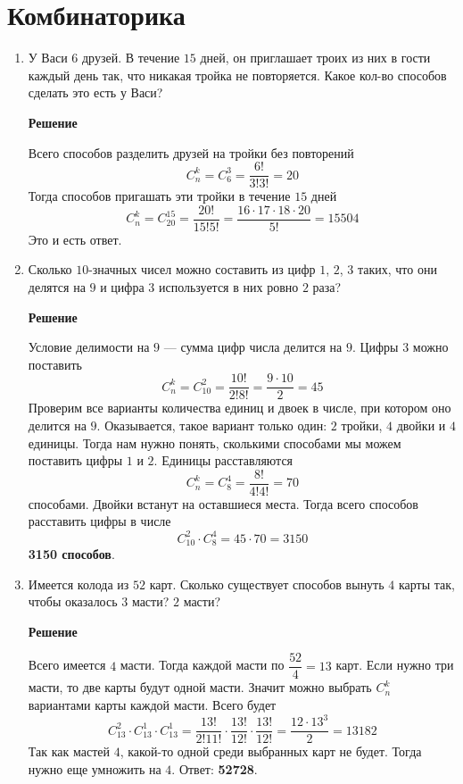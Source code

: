 \documentclass[12pt]{article}
\newcommand{\RomanNumeralCaps}[1]
{\MakeUppercase{\romannumeral #1}}
\begin{document}
	\section{Комбинаторика \RomanNumeralCaps{1}}
	\begin{enumerate}[label={\textbf{\arabic{section}.\arabic*}}]
		\item У Васи $6$ друзей. В течение $15$ дней, он приглашает троих из них в гости	каждый день так, что никакая тройка не повторяется. Какое кол-во способов	сделать это есть у Васи?

		
		\textbf{Решение}
		
		Всего способов разделить друзей на тройки без повторений 
		$$
		C_n^k = C_6^3 = \frac{6!}{3!3!} = 20
		$$
		Тогда способов пригашать эти тройки в течение $15$ дней
		$$
		C_n^k = C_{20}^{15} = \frac{20!}{15!5!} = \frac{16\cdot17\cdot18\cdot20}{5!} = 15504
		$$
		Это и есть ответ.
		
		\item Сколько $10$-значных чисел можно составить из цифр $1$, $2$, $3$ таких, что они делятся на $9$ и цифра $3$ используется в них ровно $2$ раза?
		
		\textbf{Решение}
		
		Условие делимости на $9$ --- сумма цифр числа делится на $9$. Цифры $3$ можно поставить 
		$$
		C_n^k = C_{10}^{2} = \frac{10!}{2!8!} = \frac{9\cdot10}{2} = 45
		$$
		Проверим все варианты количества единиц и двоек в числе, при котором оно делится на $9$. Оказывается, такое вариант только один: $2$ тройки, $4$ двойки и $4$ единицы. Тогда нам нужно понять, сколькими способами мы можем поставить цифры $1$ и $2$. Единицы расставляются
		$$
		C_n^k = C_{8}^{4} = \frac{8!}{4!4!} = 70
		$$
		способами. Двойки встанут на оставшиеся места. Тогда всего способов расставить цифры в числе
		$$
		C_{10}^{2}\cdot C_{8}^{4} = 45\cdot70 = 3150
		$$
		\textbf{3150 способов}.
		
		\item Имеется колода из $52$ карт. Сколько существует способов вынуть $4$ карты так, чтобы оказалось $3$ масти? $2$ масти?
		
		\textbf{Решение}
		
		Всего имеется $4$ масти. Тогда каждой масти по $\dfrac{52}{4} = 13$ карт. Если нужно три масти, то две карты будут одной масти. Значит можно выбрать $C_n^k$ вариантами карты каждой масти. Всего будет
		$$
		C_{13}^{2}\cdot C_{13}^{1}\cdot C_{13}^{1} = \frac{13!}{2!11!}\cdot \frac{13!}{12!}\cdot \frac{13!}{12!} = \frac{12\cdot13^3}{2} = 13182
		$$
		Так как мастей $4$, какой-то одной среди выбранных карт не будет. Тогда нужно еще умножить на $4$. Ответ: \textbf{52728}.
		

\end{enumerate}
\end{document}
